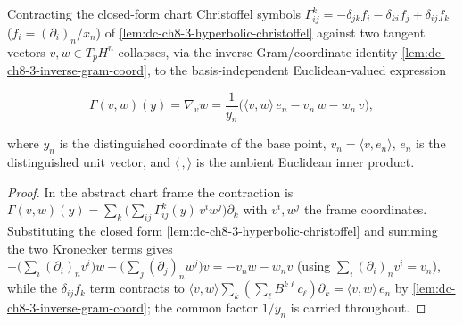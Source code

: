 \begin{lemma}
  \label{lem:dc-ch8-3-christoffel-contraction}
  \leanok
  Contracting the closed-form chart Christoffel symbols
  $\Gamma^k_{ij}=-\delta_{jk}f_i-\delta_{ki}f_j+\delta_{ij}f_k$
  ($f_i=(\partial_i)_n/x_n$) of \cref{lem:dc-ch8-3-hyperbolic-christoffel} against
  two tangent vectors $v,w\in T_pH^n$ collapses, via the inverse-Gram/coordinate
  identity \cref{lem:dc-ch8-3-inverse-gram-coord}, to the basis-independent
  Euclidean-valued expression

  $$
  \Gamma(v,w)(y)=\nabla_v w
    =\frac{1}{y_n}\Big(\langle v,w\rangle\, e_n-v_n\,w-w_n\,v\Big),
  $$

  where $y_n$ is the distinguished coordinate of the base point, $v_n=\langle v,e_n\rangle$,
  $e_n$ is the distinguished unit vector, and $\langle\,,\rangle$ is the ambient
  Euclidean inner product.
\end{lemma}
\begin{proof}
  \leanok
\sketch
  In the abstract chart frame the contraction is
  $\Gamma(v,w)(y)=\sum_k\big(\sum_{ij}\Gamma^k_{ij}(y)\,v^i w^j\big)\partial_k$ with
  $v^i,w^j$ the frame coordinates. Substituting the closed form
  \cref{lem:dc-ch8-3-hyperbolic-christoffel} and summing the two Kronecker terms
  gives $-\big(\sum_i (\partial_i)_n v^i\big)w-\big(\sum_j(\partial_j)_n w^j\big)v
  =-v_n w-w_n v$ (using $\sum_i(\partial_i)_n v^i=v_n$), while the $\delta_{ij}f_k$
  term contracts to $\langle v,w\rangle\sum_k(\sum_\ell B^{k\ell}c_\ell)\partial_k
  =\langle v,w\rangle\,e_n$ by \cref{lem:dc-ch8-3-inverse-gram-coord}; the common
  factor $1/y_n$ is carried throughout.
\end{proof}

